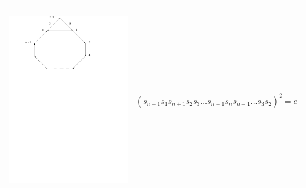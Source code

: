 \documentclass[11pt]{amsart}
\theoremstyle{definition}
\begin{document}
\begin{table}[h]
\begin{tabular}{| p{3.5cm} | p{7cm} |}
\begin{center}\includegraphics[scale = .30]{Diagram4.pdf}\end{center} & $(s_{n+1}s_{1}s_{n+1}s_{2}s_{3} \dots s_{n-1}s_{n}s_{n-1} \dots s_{3}s_{2})^{2} = e$ \\ \hline


\end{tabular}
\end{table}
\end{document}
